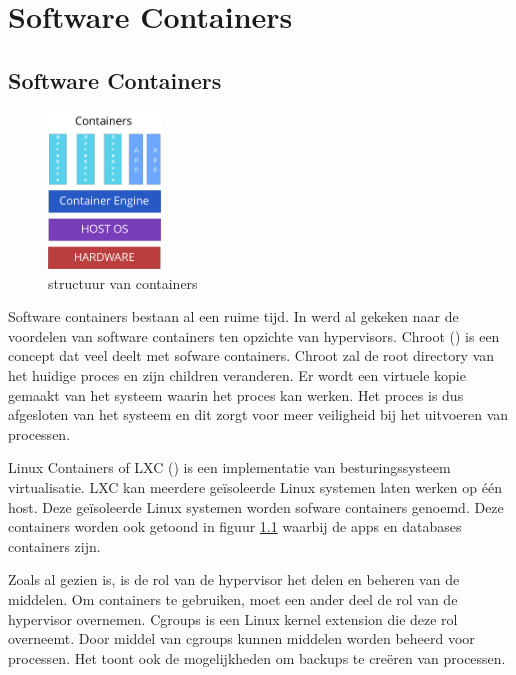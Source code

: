 \chapter{Software Containers}
\label{ch:Containers}

\section{Software Containers}

\begin{figure}
    \centering
    \includegraphics[width=3cm]{img/container}
    \caption{structuur van containers}
    \label{fig:containers}
\end{figure}

Software containers bestaan al een ruime tijd. In \cite{soltesz_container-based_2007} werd al gekeken naar de voordelen van software containers ten opzichte van hypervisors. Chroot (\cite{_linux_????}) is een concept dat veel deelt met sofware containers. Chroot zal de root directory van het huidige proces en zijn children veranderen. Er wordt een virtuele kopie gemaakt van het systeem waarin het proces kan werken. Het proces is dus afgesloten van het systeem en dit zorgt voor meer veiligheid bij het uitvoeren van processen.

Linux Containers of LXC (\cite{containers_linux_????}) is een implementatie van besturingssysteem virtualisatie. LXC kan meerdere geïsoleerde Linux systemen laten werken op één host. Deze geïsoleerde Linux systemen worden sofware containers genoemd. Deze containers worden ook getoond in figuur \ref{fig:containers} waarbij de apps en databases containers zijn.

Zoals al gezien is, is de rol van de hypervisor het delen en beheren van de middelen. Om containers te gebruiken, moet een ander deel de rol van de hypervisor overnemen. Cgroups is een Linux kernel extension die deze rol overneemt. Door middel van cgroups kunnen middelen worden beheerd voor processen. Het toont ook de mogelijkheden om backups te creëren van processen.

